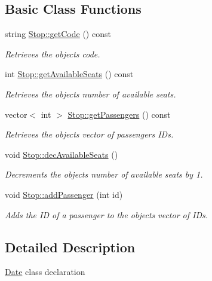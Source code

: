 \subsection*{Basic Class Functions}
\begin{DoxyCompactItemize}
\item 
string \hyperlink{group___date_ga4c0a7bb72ca7a054a394d13fc8cd9bde}{Stop\+::get\+Code} () const
\begin{DoxyCompactList}\small\item\em Retrieves the object\textquotesingle{}s code. \end{DoxyCompactList}\item 
int \hyperlink{group___date_ga41d42147d1210ce72f15e31a8414e0ad}{Stop\+::get\+Available\+Seats} () const
\begin{DoxyCompactList}\small\item\em Retrieves the object\textquotesingle{}s number of available seats. \end{DoxyCompactList}\item 
vector$<$ int $>$ \hyperlink{group___date_gabd197ec53b1215bed050d879d463e987}{Stop\+::get\+Passengers} () const
\begin{DoxyCompactList}\small\item\em Retrieves the object\textquotesingle{}s vector of passengers I\+Ds. \end{DoxyCompactList}\item 
\mbox{\label{group___date_ga491669933a1b091fa543591e9fd992aa}} 
void \hyperlink{group___date_ga491669933a1b091fa543591e9fd992aa}{Stop\+::dec\+Available\+Seats} ()
\begin{DoxyCompactList}\small\item\em Decrements the object\textquotesingle{}s number of available seats by 1. \end{DoxyCompactList}\item 
void \hyperlink{group___date_gac636e3c0c1e2794575bd3db14b5ee363}{Stop\+::add\+Passenger} (int id)
\begin{DoxyCompactList}\small\item\em Adds the ID of a passenger to the object\textquotesingle{}s vector of I\+Ds. \end{DoxyCompactList}\end{DoxyCompactItemize}


\subsection{Detailed Description}
\hyperlink{class_date}{Date} class declaration 

